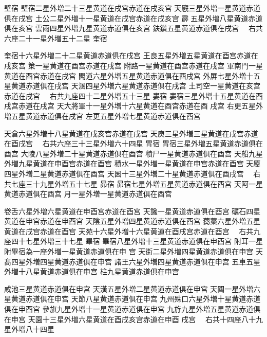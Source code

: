 \begin{正文}
壁宿
壁宿二星外増二十三星黄道在戌宫赤道在戌亥宫
天廐三星外増一星黄道赤道俱在戌宫
土公二星外増十一星黄道在戌宫赤道在戌亥宫
霹𩆝五星外増八星黄道赤道俱在亥宫
雲雨四星外増九星黄道赤道俱在亥宫
鈇鑕五星黄道赤道俱在戌宫
　右共六座二十一星外増五十二星
奎宿
\par
奎宿十六星外増二十二星黄道赤道俱在戌宫
王良五星外増五星黄道在酉宫赤道在戌亥宫
䇿一星黄道在酉宫赤道在戌宫
附路一星黄道在酉宫赤道在戌宫
軍南門一星黄道在酉宫赤道在戌宫
閣道六星外増五星黄道赤道俱在酉戌宫
外屏七星外増十五星黄道赤道俱在戌宫
天溷四星外増六星黄道赤道俱在戌宫
土司空一星黄道在亥宫赤道在戌宫
　右共九座四十二星外増五十三星
婁宿
婁宿三星外増十五星黄道在酉戌宫赤道在戌宫
天大將軍十一星外増十六星黄道在酉宫赤道在酉
戌宫
右更五星外増五星黄道赤道俱在戌宫
左更五星外増七星黄道赤道俱在酉宫
\par
天倉六星外増十八星黄道在戌亥宫赤道在戌宫
天庾三星外増三星黄道在戌宫赤道在酉戌宫
　右共六座三十三星外増六十四星
胃宿
胃宿三星外増五星黄道赤道俱在酉宫
大陵八星外増二十星黄道赤道俱在酉宫
積尸一星黄道赤道俱在酉宫
天船九星外増九星黄道在申酉宫赤道在酉宫
積水一星外増一星黄道在申宫赤道在酉宫
天廩四星外増二星黄道赤道俱在酉宫
天囷十三星外増二十星黄道赤道俱在酉戌宫
　右共七座三十九星外増五十七星
昴宿
昴宿七星外増五星黄道赤道俱在酉宫
天阿一星黄道赤道俱在酉宫
月一星外増一星黄道赤道俱在酉宫
\par
卷舌六星外増六星黄道在申酉宫赤道在酉宫
天讒一星黄道赤道俱在酉宫
礪石四星黄道在申宫赤道在申酉宫
天陰五星外増四星黄道赤道俱在酉宫
蒭藁六星外増五星黄道在戌宫赤道在酉宫
天苑十六星外増十六星黄道在酉戌宫赤道在酉宫
　右共九座四十七星外増三十七星
畢宿
畢宿八星外増十三星黄道赤道俱在申酉宫
附耳一星附畢宿為一座外増一星黄道赤道俱在申
宫
天街二星外増四星黄道赤道俱在申宫
天髙四星外増四星黄道赤道俱在申宫
諸王六星外増四星黄道赤道俱在申宫
五車五星外増十八星黄道赤道俱在申宫
柱九星黄道赤道俱在申宫
\par
咸池三星黄道赤道俱在申宫
天潢五星外増二星黄道赤道俱在申宫
天闗一星外増六星黄道赤道俱在申宫
天節八星黄道赤道俱在申宫
九州殊口六星外増十星黄道赤道俱在申酉宫
參旗九星外増十一星黄道赤道俱在申宫
九斿九星外増五星黄道赤道俱在申宫
天園十三星外増六星黄道在酉戌亥宫赤道在申酉
戌宫
　右共十四座八十九星外増八十四星

\end{正文}
